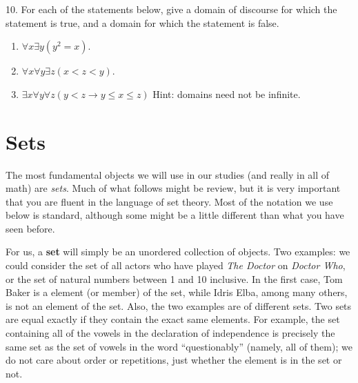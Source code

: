 \documentclass[10pt,]{book}
\newcommand{\terminology}[1]{\textbf{#1}}
\theoremstyle{plain}
\theoremstyle{definition}
\theoremstyle{definition}
\numberwithin{equation}{chapter}
\newcommand{\imp}{\rightarrow}
\newcommand{\lt}{<}
\begin{document}
\begin{exerciselist}
\par\smallskip
\item[10.]\hypertarget{exercise-20}{}\hypertarget{p-347}{}%
For each of the statements below, give a domain of discourse for which the statement is true, and a domain for which the statement is false.%
\par
\hypertarget{p-348}{}%
\leavevmode%
\begin{enumerate}[label=(\alph*)]
\item\hypertarget{li-225}{}\(\forall x \exists y (y^2 = x)\).%
\item\hypertarget{li-226}{}\(\forall x \forall y \exists z (x \lt  z \lt  y)\).%
\item\hypertarget{li-227}{}\(\exists x \forall y \forall z (y \lt  z \imp y \le x \le z)\) Hint: domains need not be infinite.%
\end{enumerate}
%
\par\smallskip
\end{exerciselist}
\typeout{************************************************}
\typeout{************************************************}
\section[{Sets}]{Sets}\label{sec_intro-sets}
\hypertarget{p-353}{}%
The most fundamental objects we will use in our studies (and really in all of math) are \emph{sets}. Much of what follows might be review, but it is very important that you are fluent in the language of set theory. Most of the notation we use below is standard, although some might be a little different than what you have seen before.%
\par
\hypertarget{p-354}{}%
For us, a \terminology{set}  will simply be an unordered collection of objects. Two examples: we could consider the set of all actors who have played \emph{The Doctor} on \emph{Doctor Who}, or the set of natural numbers between 1 and 10 inclusive. In the first case, Tom Baker is a element (or member) of the set, while Idris Elba, among many others, is not an element of the set. Also, the two examples are of different sets. Two sets are equal exactly if they contain the exact same elements. For example, the set containing all of the vowels in the declaration of independence is precisely the same set as the set of vowels in the word ``questionably'' (namely, all of them); we do not care about order or repetitions, just whether the element is in the set or not.%
\typeout{************************************************}
\typeout{************************************************}
\end{document}
